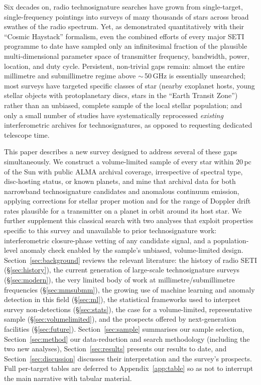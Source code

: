 \documentclass{openjournal}
\begin{document}
Six decades on, radio technosignature searches have grown from single-target,
single-frequency pointings into surveys of many thousands of stars across broad
swathes of the radio spectrum. Yet, as \citet{Wright2018} demonstrated
quantitatively with their ``Cosmic Haystack'' formalism, even the combined efforts
of every major SETI programme to date have sampled only an infinitesimal fraction
of the plausible multi-dimensional parameter space of transmitter frequency,
bandwidth, power, location, and duty cycle. Persistent, non-trivial gaps remain:
almost the entire millimetre and submillimetre regime above $\sim$\,50\,GHz is
essentially unsearched; most surveys have targeted specific classes of star
(nearby exoplanet hosts, young stellar objects with protoplanetary discs, stars in
the ``Earth Transit Zone'') rather than an unbiased, complete sample of the local
stellar population; and only a small number of studies have systematically
reprocessed \emph{existing} interferometric archives for technosignatures, as
opposed to requesting dedicated telescope time.

This paper describes a new survey designed to address several of these gaps
simultaneously. We construct a volume-limited sample of every star within
20\,pc of the Sun with public ALMA archival coverage, irrespective of
spectral type, disc-hosting status, or known planets, and mine that
archival data for both narrowband technosignature candidates and
anomalous continuum emission, applying corrections for stellar proper
motion and for the range of Doppler drift rates plausible for a
transmitter on a planet in orbit around its host star. We further
supplement this classical search with two analyses that exploit
properties specific to this survey and unavailable to prior
technosignature work: interferometric closure-phase vetting of any
candidate signal, and a population-level anomaly check enabled by the
sample's unbiased, volume-limited design.
Section~\ref{sec:background} reviews the relevant
literature: the history of radio SETI (\S\ref{sec:history}), the current
generation of large-scale technosignature surveys (\S\ref{sec:modern}), the very
limited body of work at millimetre/submillimetre frequencies
(\S\ref{sec:mmsubmm}), the growing use of machine learning and anomaly detection
in this field (\S\ref{sec:ml}), the statistical frameworks used to interpret
survey non-detections (\S\ref{sec:stats}), the case for a volume-limited,
representative sample (\S\ref{sec:volumelimited}), and the prospects offered by
next-generation facilities (\S\ref{sec:future}). Section~\ref{sec:sample}
summarises our sample selection, Section~\ref{sec:method} our data-reduction and
search methodology (including the two new analyses),
Section~\ref{sec:results} presents our results to date, and
Section~\ref{sec:discussion} discusses their interpretation and the survey's
prospects. Full per-target tables are deferred to Appendix~\ref{app:table}
so as not to interrupt the main narrative with tabular material.
\end{document}
